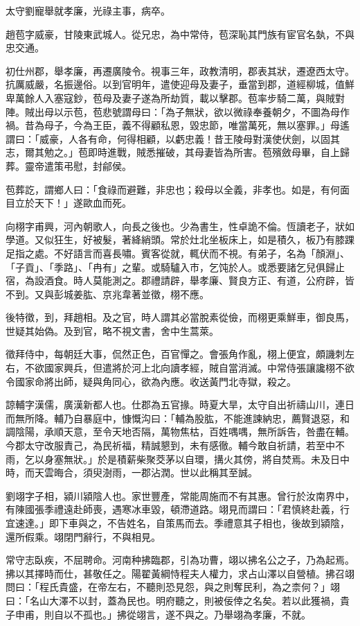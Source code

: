 \begin{pinyinscope}
太守劉寵舉就孝廉，光祿主事，病卒。

趙苞字威豪，甘陵東武城人。從兄忠，為中常侍，苞深恥其門族有宦官名埶，不與忠交通。

初仕州郡，舉孝廉，再遷廣陵令。視事三年，政教清明，郡表其狀，遷遼西太守。抗厲威嚴，名振邊俗。以到官明年，遣使迎母及妻子，垂當到郡，道經柳城，值鮮卑萬餘人入塞寇鈔，苞母及妻子遂為所劫質，載以擊郡。苞率步騎二萬，與賊對陣。賊出母以示苞，苞悲號謂母曰：「為子無狀，欲以微祿奉養朝夕，不圖為母作禍。昔為母子，今為王臣，義不得顧私恩，毀忠節，唯當萬死，無以塞罪。」母遙謂曰：「威豪，人各有命，何得相顧，以虧忠義！昔王陵母對漢使伏劍，以固其志，爾其勉之。」苞即時進戰，賊悉摧破，其母妻皆為所害。苞殯斂母畢，自上歸葬。靈帝遣策弔慰，封鄃侯。

苞葬訖，謂鄉人曰：「食祿而避難，非忠也；殺母以全義，非孝也。如是，有何面目立於天下！」遂歐血而死。

向栩字甫興，河內朝歌人，向長之後也。少為書生，性卓詭不倫。恆讀老子，狀如學道。又似狂生，好被髮，著絳綃頭。常於灶北坐板床上，如是積久，板乃有膝踝足指之處。不好語言而喜長嘯。賓客從就，輒伏而不視。有弟子，名為「顏淵」、「子貢」、「季路」、「冉有」之輩。或騎驢入市，乞饨於人。或悉要諸乞兒俱歸止宿，為設酒食。時人莫能測之。郡禮請辟，舉孝廉、賢良方正、有道，公府辟，皆不到。又與彭城姜肱、京兆韋著並徵，栩不應。

後特徵，到，拜趙相。及之官，時人謂其必當脫素從儉，而栩更乘鮮車，御良馬，世疑其始偽。及到官，略不視文書，舍中生蒿萊。

徵拜侍中，每朝廷大事，侃然正色，百官憚之。會張角作亂，栩上便宜，頗譏刺左右，不欲國家興兵，但遣將於河上北向讀孝經，賊自當消滅。中常侍張讓讒栩不欲令國家命將出師，疑與角同心，欲為內應。收送黃門北寺獄，殺之。

諒輔字漢儒，廣漢新都人也。仕郡為五官掾。時夏大旱，太守自出祈禱山川，連日而無所降。輔乃自暴庭中，慷慨沟曰：「輔為股肱，不能進諫納忠，薦賢退惡，和調陰陽，承順天意，至令天地否隔，萬物焦枯，百姓喁喁，無所訴告，咎盡在輔。今郡太守改服責己，為民祈福，精誠懇到，未有感徹。輔今敢自祈請，若至中不雨，乞以身塞無狀。」於是積薪柴聚茭茅以自環，搆火其傍，將自焚焉。未及日中時，而天雲晦合，須臾澍雨，一郡沾潤。世以此稱其至誠。

劉翊字子相，潁川潁陰人也。家世豐產，常能周施而不有其惠。曾行於汝南界中，有陳國張季禮遠赴師喪，遇寒冰車毀，頓滯道路。翊見而謂曰：「君慎終赴義，行宜速達。」即下車與之，不告姓名，自策馬而去。季禮意其子相也，後故到潁陰，還所假乘。翊閉門辭行，不與相見。

常守志臥疾，不屈聘命。河南种拂臨郡，引為功曹，翊以拂名公之子，乃為起焉。拂以其擇時而仕，甚敬任之。陽翟黃綱恃程夫人權力，求占山澤以自營植。拂召翊問曰：「程氏貴盛，在帝左右，不聽則恐見怨，與之則奪民利，為之柰何？」翊曰：「名山大澤不以封，蓋為民也。明府聽之，則被佞倖之名矣。若以此獲禍，貴子申甫，則自以不孤也。」拂從翊言，遂不與之。乃舉翊為孝廉，不就。


\end{pinyinscope}
